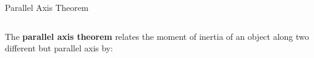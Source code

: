 \documentclass[12pt,compress,aspectratio=169]{beamer}
\begin{document}
\begin{frame}{Parallel Axis Theorem}
  \begin{columns}
    
    The \textbf{parallel axis theorem} relates the moment of inertia of an
    object along two different but parallel axis by:

  \end{columns}
\end{frame}
\end{document}
